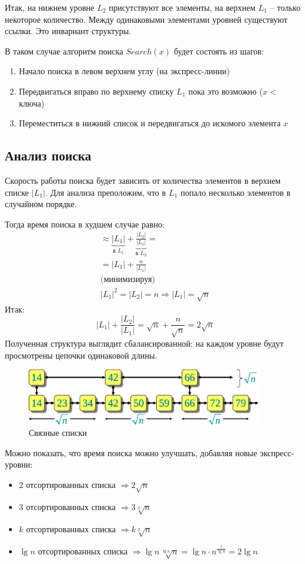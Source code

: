 \documentclass[11pt]{article}
\begin{document}
Итак, на нижнем уровне $L_2$ присутствуют все элементы, на верхнем $L_1$ -- только некоторое количество. Между одинаковыми элементами уровней существуют ссылки. Это инвариант структуры.

В таком случае алгоритм поиска $Search(x)$ будет состоять из шагов:
\begin{enumerate}
\item Начало поиска в левом верхнем углу (на экспресс-линии)
\item Передвигаться вправо по верхнему списку $L_1$ пока это возможно ($x < $ ключа)
\item Переместиться в нижний список и передвигаться до искомого элемента $x$
\end{enumerate}

\subsection{Анализ поиска}
Скорость работы поиска будет зависить от количества элементов в верхнем списке $|L_1|$. Для анализа преположим, что в $L_1$ попало несколько элементов в случайном порядке. 

Тогда время поиска в худшем случае равно:
\begin{align*}
  \approx \underbrace{|L_1|}_{\text{в }L_1} + \underbrace{\frac{|L_2|}{|L_1|}}_{\text{в }L_2} =\\
  = |L_1| + \frac{n}{|L_1|} \\
  \text{(минимизируя)} \\
  |L_1|^2 = |L_2| = n \Rightarrow |L_1| = \sqrt{n}
\end{align*}
Итак:
\begin{equation*}
  |L_1| + \frac{|L_2|}{|L_1|} = \sqrt{n} + \frac{n}{\sqrt{n}} = 2\sqrt{n}
\end{equation*}
Полученная структура выглядит сбалансированной: на каждом уровне будут просмотрены цепочки одинаковой длины.
\begin{figure}[h!]
  \centering
  \includegraphics[width=4in]{lecture12/2linklists.eps}
  \caption{Связные списки}
  \label{fig:2linklists}
\end{figure}

Можно показать, что время поиска можно улучшать, добавляя новые экспресс-уровни:
\begin{itemize}
\item $2$ отсортированных списка $\Rightarrow 2\sqrt{n}$
\item $3$ отсортированных списка $\Rightarrow 3\sqrt[3]{n}$
\item $k$ отсортированных списка $\Rightarrow k\sqrt[k]{n}$
\item $\lg n$ отсортированных списка $\Rightarrow {\lg n}\sqrt[\lg n]{n} = {\lg n}\cdot{n^{\frac{1}{\lg n}}} = 2\lg n$
\end{itemize}
\end{document}

